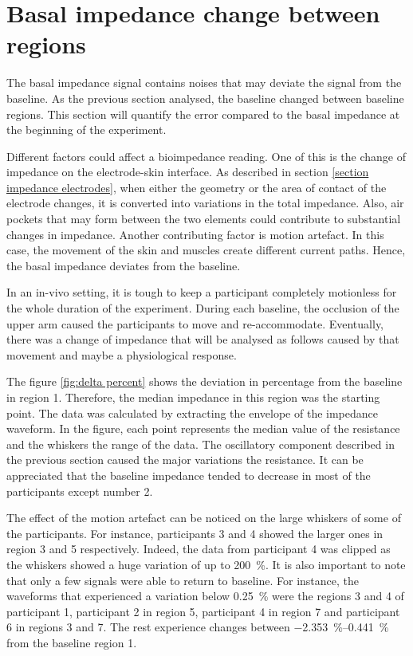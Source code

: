  
\section{Basal impedance change between regions}
\label{senction basal 3.1} 
The basal impedance signal contains noises that may deviate the signal from the baseline. As the previous section analysed, the baseline changed between baseline regions. This section will quantify the error compared to the basal impedance at the beginning of the experiment. 

Different factors could affect a bioimpedance reading. One of this is the change of impedance on the electrode-skin interface.  As described in section \ref{section impedance electrodes}, when either the geometry or the area of contact of the electrode changes, it is converted into variations in the total impedance. Also, air pockets that may form between the two elements could contribute to substantial changes in impedance.  Another contributing factor is motion artefact. In this case, the movement of the skin and muscles create different current paths. Hence, the basal impedance deviates from the baseline. 

In an in-vivo setting, it is tough to keep a participant completely motionless for the whole duration of the experiment.  During each baseline, the occlusion of the upper arm caused the participants to move and re-accommodate. Eventually, there was a change of impedance that will be analysed as follows caused by that movement and maybe a physiological response. 

The figure \ref{fig:delta percent} shows the deviation in percentage from the baseline in region 1.  Therefore, the median impedance in this region was the starting point. The data was calculated by extracting the envelope of the impedance waveform. In the figure, each point represents the median value of the resistance and the whiskers the range of the data. The oscillatory component described in the previous section caused the major variations the resistance. It can be appreciated that the baseline impedance tended to decrease in most of the participants except number 2. 

The effect of the motion artefact can be noticed on the large whiskers of some of the participants. For instance, participants 3 and 4 showed the larger ones in region 3 and 5 respectively. Indeed, the data from participant 4 was clipped as the whiskers showed a huge variation of up to \SI{200}{\percent}. It is also important to note that only a few signals were able to return to baseline. For instance, the waveforms that experienced a variation below \SI{0.25}{\percent} were the regions 3 and 4 of participant 1, participant 2 in region 5, participant 4 in region 7 and participant 6 in regions 3 and 7. The rest experience changes between \SIrange{-2.353}{0.441}{\percent} from the baseline region 1. 


